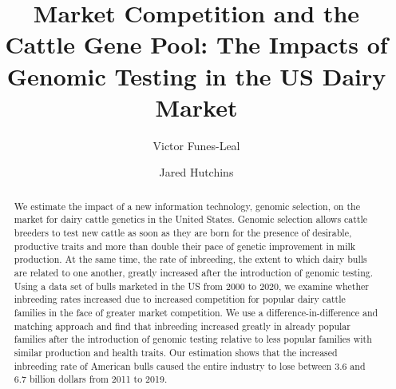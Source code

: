 \documentclass[12pt,letterpaper]{article}
\title{Market Competition and the Cattle Gene Pool: The Impacts of Genomic Testing in the US Dairy Market}
\author[1]{Victor Funes-Leal}
\author[2]{Jared Hutchins}
\affil[1]{Department of Agricultural Economics and Agribusiness\\ University of Arkansas}
\affil[2]{Department of Agricultural and Consumer Economics\\ University of Illinois Urbana Champaign}
\date{} %
\begin{document}
\maketitle



\begin{abstract}
    \noindent
    \singlespacing
    
    We estimate the impact of a new information technology, genomic selection, on the market for dairy cattle genetics in the United States. 
    Genomic selection allows cattle breeders to test new cattle as soon as they are born for the presence of desirable, productive traits and more than double their pace of genetic improvement in milk production.
    At the same time, the rate of inbreeding, the extent to which dairy bulls are related to one another, greatly increased after the introduction of genomic testing.
    Using a data set of bulls marketed in the US from 2000 to 2020, we examine whether inbreeding rates increased due to increased competition for popular dairy cattle families in the face of greater market competition.
    We use a difference-in-difference and matching approach and find that inbreeding increased greatly in already popular families after the introduction of genomic testing relative to less popular families with similar production and health traits.
    Our estimation shows that the increased inbreeding rate of American bulls caused the entire industry to lose between 3.6 and 6.7 billion dollars from 2011 to 2019. 
\end{abstract}

\newpage
\end{document}
